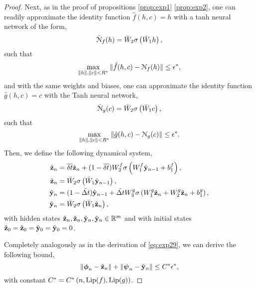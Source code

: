 \documentclass{article} \usepackage{iclr2022_conference,times}
\newcommand{\by}{{\bf y}}
\newcommand{\bz}{{\bf z}}
\newcommand{\bc}{{\boldsymbol{\psi}}}
\newcommand{\bh}{{\boldsymbol{\phi}}}
\newcommand{\R}{{\mathbb R}}
\newcommand{\Dt}{{\Delta t}}
\newcommand{\cN}{\EuScript{N}}
\begin{document}
\begin{proof}
Next, as in the proof of propositions \ref{prop:exp1} \ref{prop:exp2}, one can readily approximate the identity function $\hat{f}(h,c) = h$ with a tanh neural network of the form,
\begin{equation}
\label{eq:hmmnfh}
\bar{\cN}_f(h) = \bar{W}_2\sigma\left(\bar{W}_1 h \right),
\end{equation}
 such that
\begin{equation}
    \label{eq:phmm5}
    \max\limits_{\|h\|,\|c\| < R^{\ast}} \|\hat{f}(h,c) - \cN_f(h) \| \leq \epsilon^{\ast},
\end{equation}
and with the same weights and biases, one can approximate the identity function $\hat{g}(h,c) = c$ with the Tanh neural network,
\begin{equation}
\label{eq:hmmngh}
\bar{\cN}_g(c) = \bar{W}_2\sigma\left(\bar{W}_1 c \right),
\end{equation}
 such that
\begin{equation}
    \label{eq:phmm6}
    \max\limits_{\|h\|,\|c\|< R^{\ast}} \|\hat{g}(h,c) - \cN_g(c) \| \leq \epsilon^{\ast}.
\end{equation}
Then, we define the following dynamical system, 
\begin{equation}
    \label{eq:phmm7}
    \begin{aligned}
    \hat{\bz}_n &= \overline{\delta t}\hat{\bz}_n + (1-\overline{\delta t})W^f_2\sigma\left(W^f_1 \hat{\by}_{n-1} + b^f_1 \right), \\
\tilde{\bz}_n &= \bar{W}_2\sigma\left(\bar{W}_1 \hat{\by}_{n-1} \right), \\
\hat{\by}_n &= (1-\tilde{\Dt})\hat{\by}_{n-1} +\tilde{\Dt} W^g_3\sigma\left(W^g_1 \hat{\bz}_{n} + W^g_2 \tilde{\bz}_{n} + b^g_1 \right), \\
\tilde{\by}_n &= \bar{W}_2\sigma\left(\bar{W}_1 \hat{\bz}_{n} \right),
    \end{aligned}
\end{equation}
with hidden states $\hat{\bz}_n,\tilde{\bz}_n, \hat{\by}_n,\tilde{\by}_n \in \R^{m}$ and with initial states $\hat{\bz}_0 = \tilde{\bz}_0=\hat{\by}_0 = \tilde{\by}_0 = 0$.

Completely analogously as in the derivation of \eqref{eq:exp29}, we can derive the following bound,
\begin{equation}
    \label{eq:phmm8}
     \|\bh_n - \hat{\bz}_n\| + \|\bc_{n} - \hat{\by}_{n}\| \leq C^{\ast}\epsilon^{\ast},
\end{equation}
with constant $C^{\ast} = C^{\ast}\left(n,{\rm Lip}(f),{\rm Lip}(g)\right)$. 


\end{proof}
\end{document}
